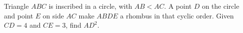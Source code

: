 Triangle $ABC$ is inscribed in a circle, with $AB<AC$. A point $D$ on the circle and point $E$ on side $AC$ make $ABDE$ a rhombus in that cyclic order. Given $CD=4$ and $CE=3$, find $AD^2$.
